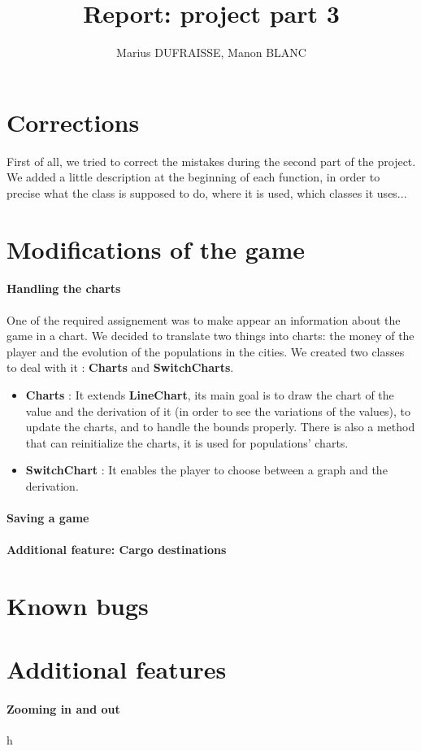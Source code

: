 \documentclass[a4paper]{article}
\title{Report: project part 3}
\author{Marius DUFRAISSE, Manon BLANC}
\date{  }
\begin{document}
	\maketitle
	\thispagestyle{fancy}
	\section{Corrections}
	
	First of all, we tried to correct the mistakes during the second part of the project. We added a little description at the beginning of each function, in order to precise what the class is supposed to do, where it is used, which classes it uses...
	
	\section{Modifications of the game}
	
	\paragraph{Handling the charts} 
	One of the required assignement was to make appear an information about the game in a chart. We decided to translate two things into charts: the money of the player and the evolution of the populations in the cities. We created two classes to deal with it : \textbf{Charts} and \textbf{SwitchCharts}. 
	\begin{itemize}
		\item \textbf{Charts }: It extends \textbf{LineChart}, its main goal is to draw the chart of the value and the derivation of it (in order to see the variations of the values), to update the charts, and to handle the bounds properly. There is also a method that can reinitialize the charts, it is used for populations' charts.
		\item \textbf{SwitchChart} : It enables the player to choose between a graph and the derivation. 
	\end{itemize} 
	\paragraph{Saving a game}
	\paragraph{Additional feature: Cargo destinations}
	
	\section{Known bugs}
	
	\section{Additional features}
	\paragraph{Zooming in and out}
	h
	
	
	
\end{document}
